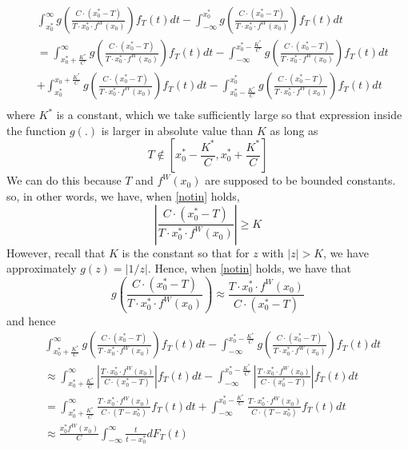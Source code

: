 \documentclass[12pt]{amsart}
\theoremstyle{definition}
\numberwithin{equation}{section}
\numberwithin{equation}{section}
\theoremstyle{remark}
\numberwithin{equation}{section}
\begin{document}
\begin{align}
&\label{lalala}\int_{x_0^*}^\infty   g\left(\frac{C\cdot (x_0^*-T)}{T\cdot x_0^*\cdot f^W(x_0)}\right )
f_T(t)dt-\int_{-\infty}^{x_0^*}    g\left(\frac{C\cdot (x_0^*-T)}{T\cdot x_0^*\cdot f^W(x_0)}\right)f_T(t)dt\\
&=\int_{x_0^*+\frac{K^*}{C}}^\infty   g\left(\frac{C\cdot (x_0^*-T)}{T\cdot x_0^*\cdot f^W(x_0)}\right )
f_T(t)dt-\int_{-\infty}^{x_0^*-\frac{K^*}{C}}    g\left(\frac{C\cdot (x_0^*-T)}{T\cdot x_0^*\cdot f^W(x_0)}\right)f_T(t)dt\\
&+\int_{x_0^*}^{x_0+\frac{K^*}{C}}  g\left(\frac{C\cdot (x_0^*-T)}{T\cdot x_0^*\cdot f^W(x_0)}\right )
f_T(t)dt-\int_{x_0^*-\frac{K^*}{C}}^{x_0^*}    g\left(\frac{C\cdot (x_0^*-T)}{T\cdot x_0^*\cdot f^W(x_0)}\right)f_T(t)dt\\
\end{align}
where $K^*$ is a constant, which we take sufficiently large so that expression inside the function $g(.)$ is larger in absolute value than $K$ as long as
\begin{equation}
\label{notin}
T\notin[x_0^*-\frac{K^*}{C},x_0^*+\frac{K^*}{C}]
\end{equation}
We can do this because $T$ and $f^W(x_0)$ are supposed to be bounded constants.
so, in other words, we have, when \ref{notin} holds,
$$|\frac{C\cdot (x_0^*-T)}{T\cdot x_0^*\cdot f^W(x_0)}|\geq K$$
However, recall that $K$ is the constant so that for $z$ with $|z|>K$, we have approximately $g(z)=|1/z|$. Hence, when
\ref{notin} holds, we have that
$$g\left(\frac{C\cdot (x_0^*-T)}{T\cdot x_0^*\cdot f^W(x_0)}\right ) \approx \frac{T\cdot x_0^*\cdot f^W(x_0)}{C\cdot (x_0^*-T)}$$
and hence
\begin{align*}&\int_{x_0^*+\frac{K^*}{C}}^\infty   g\left(\frac{C\cdot (x_0^*-T)}{T\cdot x_0^*\cdot f^W(x_0)}\right )
f_T(t)dt-\int_{-\infty}^{x_0^*-\frac{K^*}{C}}    g\left(\frac{C\cdot (x_0^*-T)}{T\cdot x_0^*\cdot f^W(x_0)}\right)f_T(t)dt\\
 & \approx
 \int_{x_0^*+\frac{K^*}{C}}^\infty  \left|  \frac{T\cdot x_0^*\cdot f^W(x_0)}{C\cdot (x_0^*-T)}\right|
 f_T(t)dt-\int_{-\infty}^{x_0^*-\frac{K^*}{C}}  \left| \frac{T\cdot x_0^*\cdot f^W(x_0)}{C\cdot (x_0^*-T)}\right|
  f_T(t)dt\\
  &=\int_{x_0^*+\frac{K^*}{C}}^\infty  \frac{T\cdot x_0^*\cdot f^W(x_0)}{C\cdot (T-x_0^*)}
  f_T(t)dt+\int_{-\infty}^{x_0^*-\frac{K^*}{C}}  \frac{T\cdot x_0^*\cdot f^W(x_0)}{C\cdot (T-x_0^*)}
  f_T(t)dt\\
  & \approx \frac{x_0^*f^W(x_0)}{C} \int_{-\infty}^{\infty}\frac{t}{t-x_0^*}dF_T(t)
  \end{align*}
\end{document}

